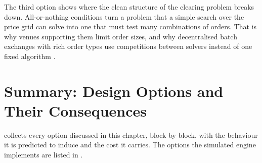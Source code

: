 The third option shows where the clean structure of the clearing problem
breaks down. All-or-nothing conditions turn a problem that a simple search
over the price grid can solve into one that must test many combinations of
orders. That is why venues supporting them limit order sizes, and why
decentralised batch exchanges with rich order types use competitions between
solvers instead of one fixed algorithm \citep{harrison2025hybrid}.

\section{Summary: Design Options and Their Consequences}
\label{sec:consequences}

 collects every option discussed in this chapter,
block by block, with the behaviour it is predicted to induce and the cost it
carries. The options the simulated engine implements are listed in
.

